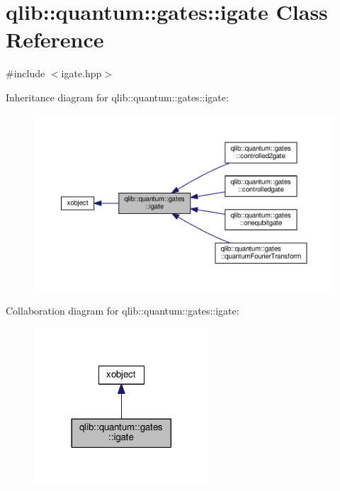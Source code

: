 \hypertarget{classqlib_1_1quantum_1_1gates_1_1igate}{}\section{qlib\+:\+:quantum\+:\+:gates\+:\+:igate Class Reference}
\label{classqlib_1_1quantum_1_1gates_1_1igate}


{\ttfamily \#include $<$igate.\+hpp$>$}



Inheritance diagram for qlib\+:\+:quantum\+:\+:gates\+:\+:igate\+:
\nopagebreak
\begin{figure}[H]
\begin{center}
\leavevmode
\includegraphics[width=350pt]{classqlib_1_1quantum_1_1gates_1_1igate__inherit__graph}
\end{center}
\end{figure}


Collaboration diagram for qlib\+:\+:quantum\+:\+:gates\+:\+:igate\+:\nopagebreak
\begin{figure}[H]
\begin{center}
\leavevmode
\includegraphics[width=185pt]{classqlib_1_1quantum_1_1gates_1_1igate__coll__graph}
\end{center}
\end{figure}
